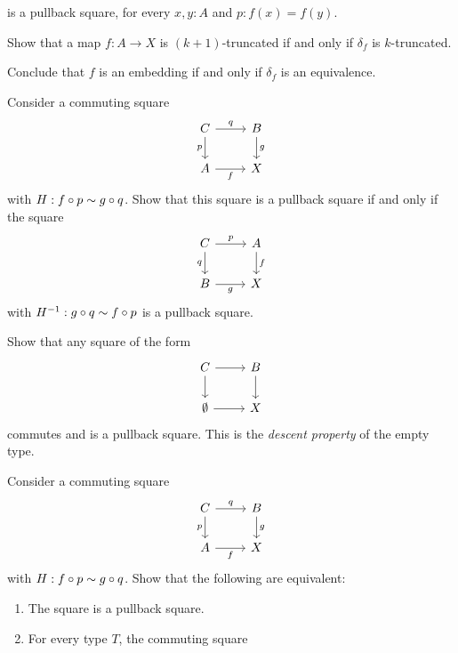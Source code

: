 \begin{exercises}
\begin{subexenum}
is a pullback square, for every $x,y:A$ and $p:f(x)=f(y)$.
\item Show that a map $f:A\to X$ is $(k+1)$-truncated if and only if $\delta_f$ is $k$-truncated.
\end{subexenum}
Conclude that $f$ is an embedding if and only if $\delta_f$ is an equivalence.
\item Consider a commuting square 
\begin{equation*}
\begin{tikzcd}
C \arrow[r,"q"] \arrow[d,swap,"p"] & B \arrow[d,"g"] \\
A \arrow[r,swap,"f"] & X 
\end{tikzcd}
\end{equation*}
with $H:f\circ p\sim g\circ q$. Show that this square is a pullback square if and only if the square
\begin{equation*}
\begin{tikzcd}
C \arrow[r,"p"] \arrow[d,swap,"q"] & A \arrow[d,"f"] \\
B \arrow[r,swap,"g"] & X 
\end{tikzcd}
\end{equation*}
with $H^{-1}:g\circ q\sim f\circ p$ is a pullback square.
\item Show that any square of the form
\begin{equation*}
\begin{tikzcd}
C \arrow[r] \arrow[d] & B \arrow[d] \\
\emptyt \arrow[r] & X
\end{tikzcd}
\end{equation*}
commutes and is a pullback square. This is the \emph{descent property} of the empty type.
\item Consider a commuting square
\begin{equation*}
\begin{tikzcd}
C \arrow[r,"q"] \arrow[d,swap,"p"] & B \arrow[d,"g"] \\
A \arrow[r,swap,"f"] & X
\end{tikzcd}
\end{equation*}
with $H:f\circ p\sim g\circ q$. Show that the following are equivalent:
\begin{enumerate}
\item The square is a pullback square.
\item For every type $T$, the commuting square
\begin{equation*}

\end{equation*}
\end{enumerate}
\end{exercises}
